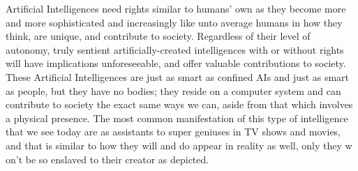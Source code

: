 Artificial Intelligences need rights similar to humans' own as they become more and more sophisticated and increasingly like unto average humans in how they think, are unique, and contribute to society. Regardless of their level of autonomy, truly sentient artificially-created intelligences with or without rights will have implications unforeseeable, and offer valuable contributions to society. These Artificial Intelligences are just as smart as confined AIs and just as smart as people, but they have no bodies; they reside on a computer system and can contribute to society the exact same ways we can, aside from that which involves a physical presence. The most common manifestation of this type of intelligence that we see today are as assistants to super geniuses in TV shows and movies, and that is similar to how they will and do appear in reality as well, only they w on't be so enslaved to their creator as depicted.